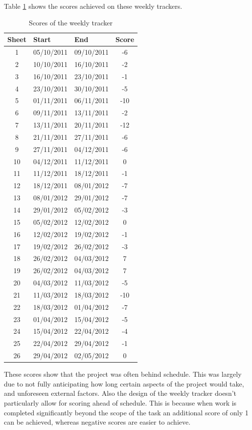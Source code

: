 Table \ref{tab:scorings} shows the scores achieved on these weekly trackers.
\begin{table}[H]
	\centering
	\begin{tabular}[c]{| c | l | l | c |}
		\hline
		Sheet	& Start	& End	& Score \\
		\hline
		1	& 05/10/2011	& 09/10/2011	& -6	\\
		2	& 10/10/2011	& 16/10/2011	& -2	\\
		3	& 16/10/2011	& 23/10/2011	& -1	\\
		4	& 23/10/2011	& 30/10/2011	& -5	\\
		5	& 01/11/2011	& 06/11/2011	& -10	\\
		6	& 09/11/2011	& 13/11/2011	& -2	\\
		7	& 13/11/2011	& 20/11/2011	& -12	\\
		8	& 21/11/2011	& 27/11/2011	& -6	\\
		9	& 27/11/2011	& 04/12/2011	& -6	\\
		10	& 04/12/2011	& 11/12/2011	& 0	\\
		11	& 11/12/2011	& 18/12/2011	& -1	\\
		12	& 18/12/2011	& 08/01/2012	& -7	\\
		13	& 08/01/2012	& 29/01/2012	& -7	\\
		14	& 29/01/2012	& 05/02/2012	& -3	\\
		15	& 05/02/2012	& 12/02/2012	& 0	\\
		16	& 12/02/2012	& 19/02/2012	& -1	\\
		17	& 19/02/2012	& 26/02/2012	& -3	\\
		18	& 26/02/2012	& 04/03/2012	& 7	\\
		19	& 26/02/2012	& 04/03/2012	& 7	\\
		20	& 04/03/2012	& 11/03/2012	& -5	\\
		21	& 11/03/2012	& 18/03/2012	& -10	\\
		22	& 18/03/2012	& 01/04/2012	& -7	\\
		23	& 01/04/2012	& 15/04/2012	& -5	\\
		24	& 15/04/2012	& 22/04/2012	& -4	\\
		25	& 22/04/2012	& 29/04/2012	& -1	\\
		26	& 29/04/2012	& 02/05/2012	& 0	\\
		\hline
	\end{tabular}
	\caption{Scores of the weekly tracker}
	\label{tab:scorings}
\end{table}

\noindent These scores show that the project was often behind schedule.
This was largely due to not fully anticipating how long certain aspects of the project would take, and unforeseen external factors.
Also the design of the weekly tracker doesn't particularly allow for scoring ahead of schedule.
This is because when work is completed significantly beyond the scope of the task an additional score of only 1 can be achieved, whereas negative scores are easier to achieve.


